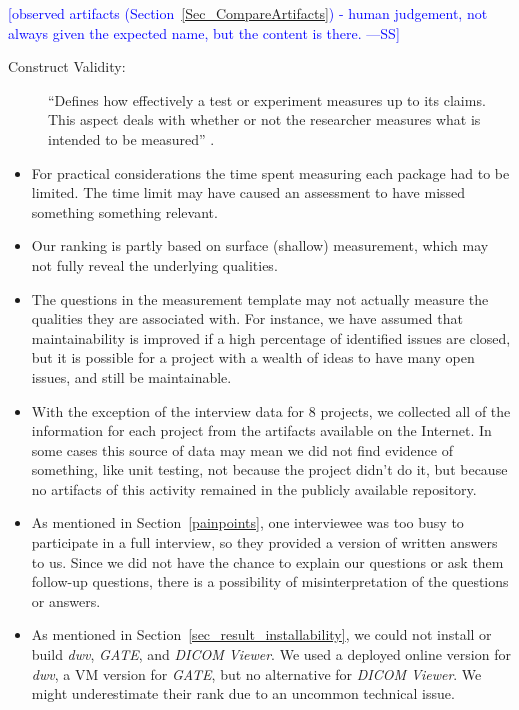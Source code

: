 \documentclass[final, 3p, times, authoryear]{elsarticle}
\newcommand{\authornote}[3]{\textcolor{#1}{[#3 ---#2]}}
\newcommand{\authornote}[3]{}
\newcommand{\wss}[1]{\authornote{blue}{SS}{#1}} %
\begin{document}
\wss{observed artifacts (Section~\ref{Sec_CompareArtifacts}) - human judgement,
not always given the expected name, but the content is there.}

\begin{description}
    \item[Construct Validity:] ``Defines how effectively a test or experiment measures
    up to its claims. This aspect deals with whether or not the researcher measures
    what is intended to be measured'' \citep{AmpatzoglouEtAl2019}.
\end{description}

\begin{itemize}
\item For practical considerations the time spent measuring each package had to
be limited.  The time limit may have caused an assessment to have missed
something something relevant.
\item Our ranking is partly based on surface (shallow) measurement, which may
not fully reveal the underlying qualities.
\item The questions in the measurement template may not actually measure the
qualities they are associated with.  For instance, we have assumed that
maintainability is improved if a high percentage of identified issues are
closed, but it is possible for a project with a wealth of ideas to have many
open issues, and still be maintainable.
\item With the exception of the interview data for 8 projects, we collected all
of the information for each project from the artifacts available on the
Internet. In some cases this source of data may mean we did not find evidence of
something, like unit testing, not because the project didn't do it, but because
no artifacts of this activity remained in the publicly available repository.
\item As mentioned in Section~\ref{painpoints}, one interviewee was too busy
to participate in a full interview, so they provided a version of written answers
to us. Since we did not have the chance to explain our questions or ask them
follow-up questions, there is a possibility of misinterpretation of the
questions or answers.
\item As mentioned in Section~\ref{sec_result_installability}, we could not
install or build \textit{dwv}, \textit{GATE}, and \textit{DICOM Viewer}. We used
a deployed online version for \textit{dwv}, a VM version for \textit{GATE}, but
no alternative for \textit{DICOM Viewer}. We might underestimate their rank due
to an uncommon technical issue.
\end{itemize}
\end{document}
